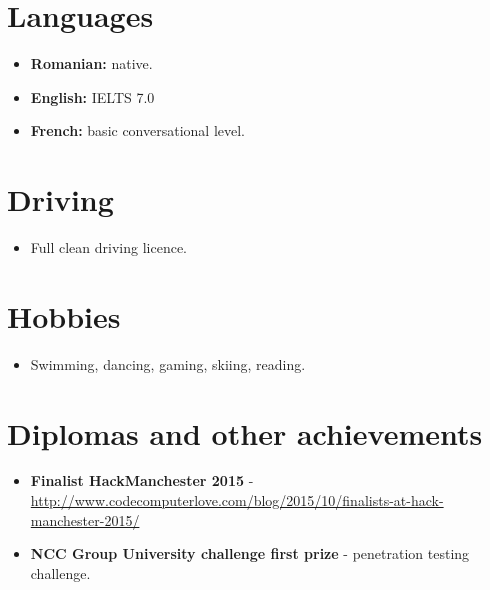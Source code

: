 \documentclass[12pt,a4paper]{res}
\begin{document}
\begin{resume}
\begin{itemize}
  
  \end{itemize}
\vspace{-3mm}

\section{Languages}
\vspace{-0.7mm}
\begin{itemize}
\item[] {\bf Romanian:} native.
\item[] {\bf English:} IELTS 7.0
\item[] {\bf French:} basic conversational level.
\end{itemize}
\vspace{-3mm}

\section{Driving}
\vspace{-0.7mm}
\begin{itemize}
\item[] Full clean driving licence.
\end{itemize}
  \vspace{-3mm}
  
\section{Hobbies}
\vspace{-0.7mm}
  \begin{itemize}
  \item[] Swimming, dancing, gaming, skiing, reading.
  \end{itemize}

\section{\large\bf Diplomas and other achievements}
  \begin{itemize}
  \item {\bf Finalist HackManchester 2015} - \url{http://www.codecomputerlove.com/blog/2015/10/finalists-at-hack-manchester-2015/}
  \item {\bf NCC Group University challenge first prize} - penetration testing challenge.
  \end{itemize}
\end{resume}
\end{document}
